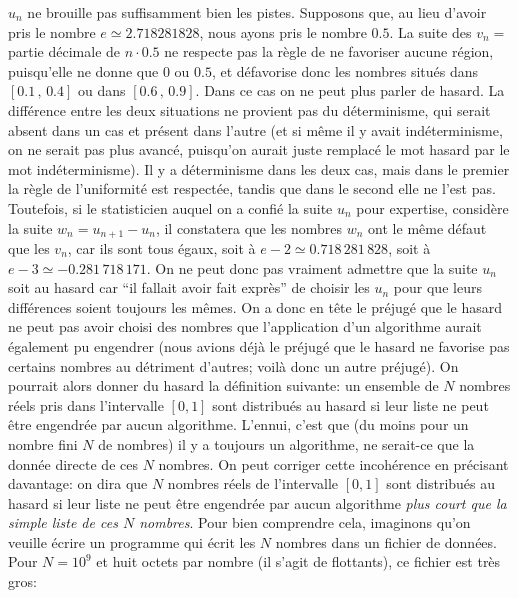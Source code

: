 $u_n$ ne brouille pas suffisamment bien les pistes.  
\medskip 
Supposons que, au lieu d'avoir pris le nombre $e \simeq 2.718281828$, 
nous ayons pris le nombre $0.5$. La suite des  $v_n = $ partie d\'ecimale 
de $n \cdot 0.5$  ne respecte pas la r\`egle de  ne favoriser aucune 
r\'egion, puisqu'elle  ne donne que $0$ ou $0.5$, et d\'efavorise donc les 
nombres situ\'es  dans $[0.1\, ,\, 0.4]$ ou dans  $[0.6\, , \, 0.9]$. Dans ce 
cas on ne peut plus parler de hasard. La diff\'erence entre les deux 
situations ne provient pas du d\'eterminisme, qui serait absent dans un 
cas et pr\'esent dans l'autre (et si m\^eme il y avait ind\'eterminisme, on 
ne serait pas plus avanc\'e, puisqu'on aurait juste remplac\'e le mot 
hasard par le mot ind\'eterminisme). Il y a d\'eterminisme dans les deux 
cas, mais dans le premier la r\`egle de l'uniformit\'e est 
respect\'ee, tandis que dans le second elle ne l'est pas. Toutefois, si le 
statisticien auquel on   a confi\'e la suite $u_n$ pour expertise, 
consid\`ere la suite $w_n = u_{n+1} - u_n$, il constatera que les nombres 
$w_n$ ont le m\^eme d\'efaut que les $v_n$, car ils sont tous \'egaux, 
soit \`a $e-2 \simeq 0.718\, 281\, 828$, soit \`a $e-3 \simeq -0.281\, 
718\, 171$.  
\medskip 
On ne peut donc pas vraiment admettre  que la suite $u_n$ 
soit au hasard car ``il fallait avoir fait expr\`es'' de choisir les $u_n$ 
pour que leurs diff\'erences soient toujours les m\^emes. On a donc en 
t\^ete le pr\'ejug\'e que le hasard ne peut pas avoir choisi des nombres  
que l'application d'un algorithme aurait \'egalement pu engendrer (nous 
avions d\'ej\`a le pr\'ejug\'e que le hasard ne favorise pas certains 
nombres au d\'etriment d'autres; voil\`a donc un autre pr\'ejug\'e). On 
pourrait alors donner du hasard la d\'efinition suivante: un ensemble de 
$N$ nombres r\'eels pris dans l'intervalle $[0 , 1]$ sont distribu\'es au 
hasard si leur liste ne peut \^etre engendr\'ee par aucun algorithme. 
L'ennui, c'est que (du moins pour un nombre fini $N$ de nombres) il y a 
toujours un algorithme, ne serait-ce que la donn\'ee directe de ces $N$ 
nombres. On peut corriger cette incoh\'erence en pr\'ecisant davantage:  
on dira que $N$ nombres r\'eels de l'intervalle $[0 , 1]$ sont distribu\'es 
au hasard si leur liste ne peut \^etre engendr\'ee par aucun algorithme  
{\it plus court que la simple liste de ces $N$ nombres}. Pour bien  
comprendre cela, imaginons qu'on veuille \'ecrire un programme qui   
\'ecrit les $N$ nombres dans un fichier de donn\'ees. Pour $N = 10^9$ et 
huit octets par nombre (il s'agit de flottants), ce fichier est tr\`es gros: 
